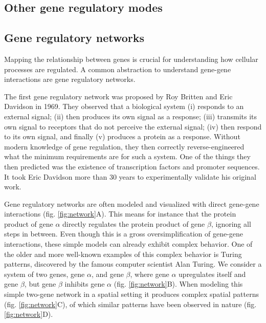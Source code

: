 \subsection{Other gene regulatory modes}

\subsection{Gene regulatory networks}

Mapping the relationship between genes is crucial for understanding how cellular processes are regulated. A common abstraction to understand gene-gene interactions are gene regulatory networks.  

The first gene regulatory network was proposed by Roy Britten and Eric Davidson in 1969\cite{Britten_1969}. They observed that a biological system (i) responds to an external signal; (ii) then produces its own signal as a response; (iii) transmits its own signal to receptors that do not perceive the external signal; (iv) then respond to its own signal, and finally (v) produces a protein as a response. Without modern knowledge of gene regulation, they then correctly reverse-engineered what the minimum requirements are for such a system. One of the things they then predicted was the existence of transcription factors and promoter sequences. It took Eric Davidson more than 30 years to experimentally validate his original work\cite{Davidson_2002}.

Gene regulatory networks are often modeled and visualized with direct gene-gene interactions (fig. \ref{fig:network}A). This means for instance that the protein product of gene $\alpha$ directly regulates the protein product of gene $\beta$, ignoring all steps in between. Even though this is a gross oversimplification of gene-gene interactions, these simple models can already exhibit complex behavior. One of the older and more well-known examples of this complex behavior is Turing patterns, discovered by the famous computer scientist Alan Turing\cite{Turing1952}. We consider a system of two genes, gene $\alpha$, and gene $\beta$, where gene $\alpha$ upregulates itself and gene $\beta$, but gene $\beta$ inhibits gene $\alpha$ (fig. \ref{fig:network}B). When modeling this simple two-gene network in a spatial setting it produces complex spatial patterns (fig. \ref{fig:network}C), of which similar patterns have been observed in nature (fig. \ref{fig:network}D).


